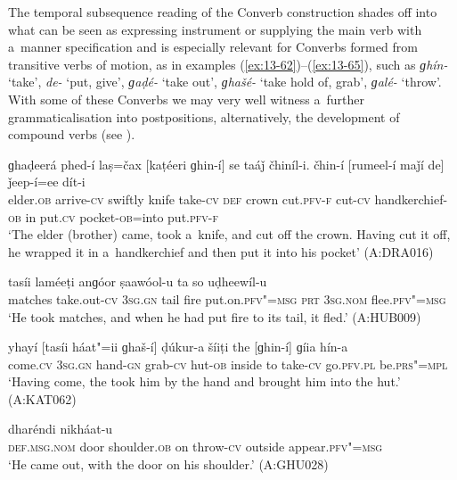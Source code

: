  The temporal subsequence reading of the Converb construction shades off into what can be seen as expressing instrument or supplying the main verb with a~manner specification and is especially relevant for Converbs formed from transitive verbs of motion, as in examples (\ref{ex:13-62})--(\ref{ex:13-65}), such as \textit{ɡhín-} `take', \textit{de-} `put, give', \textit{ɡaḍé-} `take out', \textit{ɡhašé-} `take hold of, grab', \textit{ɡalé-} `throw'. With some of these Converbs we may very well witness a~further grammaticalisation into postpositions, alternatively, the development of compound verbs (see ). 

\begin{exe}
\ex
\label{ex:13-62}
\gll ɡhaḍeerá phed-í laṣ=čax [kaṭéeri ɡhin-í] se taáǰ čhiníl-i. čhin-í [rumeel-í maǰí de] ǰeep-í=ee dít-i \\
elder.\textsc{ob} arrive-\textsc{cv} swiftly knife take-\textsc{cv} \textsc{def} crown cut.\textsc{pfv-f} cut-\textsc{cv} handkerchief-\textsc{ob} in put.\textsc{cv} pocket-\textsc{ob}=into put.\textsc{pfv-f} \\
\glt `The elder (brother) came, took a~knife, and cut off the crown. Having cut it off, he wrapped it in a~handkerchief and then put it into his pocket' (A:DRA016)

\ex
\label{ex:13-63}
 tasíi laméeṭi anɡóor ṣaawóol-u ta so uḍheewíl-u \\
matches take.out-\textsc{cv} \textsc{3sg.gn} tail fire put.on.\textsc{pfv"=msg}  \textsc{prt } \textsc{3sg.nom} flee.\textsc{pfv"=msg} \\
\glt `He took matches, and when he had put fire to its tail, it fled.' (A:HUB009)

\ex
\label{ex:13-64}
\gll yhayí [tasíi háat"=ii ɡhaš-í] ḍúkur-a šíiṭi the [ɡhin-í] ɡíia hín-a  \\
come.\textsc{cv} \textsc{3sg.gn} hand-\textsc{gn} grab-\textsc{cv} hut-\textsc{ob} inside to  take-\textsc{cv} go.\textsc{pfv.pl} be.\textsc{prs"=mpl} \\
\glt `Having come, the took him by the hand and brought him into the hut.' (A:KAT062)

\ex
\label{ex:13-65}
 dharéndi nikháat-u \\
\textsc{def.msg.nom} door shoulder.\textsc{ob} on throw-\textsc{cv} outside appear.\textsc{pfv"=msg} \\
\glt `He came out, with the door on his shoulder.' (A:GHU028) 
\end{exe}

